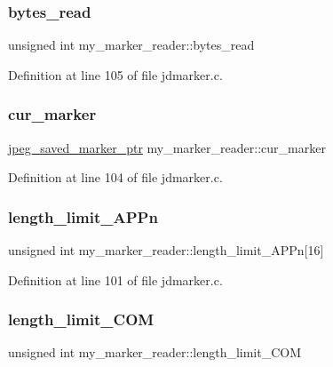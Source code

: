 \subsubsection{\texorpdfstring{bytes\_read}{bytes\_read}}
{\footnotesize\ttfamily unsigned int my\+\_\+marker\+\_\+reader\+::bytes\+\_\+read}



Definition at line 105 of file jdmarker.\+c.

\mbox{\label{structmy__marker__reader_a861ef3029e1690b4345a8ceb3975e8df}} 
\subsubsection{\texorpdfstring{cur\_marker}{cur\_marker}}
{\footnotesize\ttfamily \mbox{\hyperlink{jpeglib_8h_a2efb5205b3e81589f2dc133f1a412bb0}{jpeg\+\_\+saved\+\_\+marker\+\_\+ptr}} my\+\_\+marker\+\_\+reader\+::cur\+\_\+marker}



Definition at line 104 of file jdmarker.\+c.

\mbox{\label{structmy__marker__reader_a029e9f21bc02a21c1a26d3c0d7158098}} 
\subsubsection{\texorpdfstring{length\_limit\_APPn}{length\_limit\_APPn}}
{\footnotesize\ttfamily unsigned int my\+\_\+marker\+\_\+reader\+::length\+\_\+limit\+\_\+\+A\+P\+Pn\mbox{[}16\mbox{]}}



Definition at line 101 of file jdmarker.\+c.

\mbox{\label{structmy__marker__reader_aa17938db027aceb539d880b78841826e}} 
\subsubsection{\texorpdfstring{length\_limit\_COM}{length\_limit\_COM}}
{\footnotesize\ttfamily unsigned int my\+\_\+marker\+\_\+reader\+::length\+\_\+limit\+\_\+\+C\+OM}



